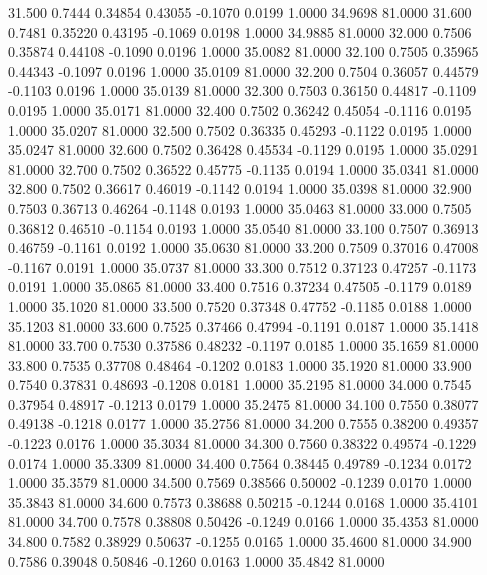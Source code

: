   31.500   0.7444   0.34854   0.43055  -0.1070   0.0199   1.0000  34.9698  81.0000
  31.600   0.7481   0.35220   0.43195  -0.1069   0.0198   1.0000  34.9885  81.0000
  32.000   0.7506   0.35874   0.44108  -0.1090   0.0196   1.0000  35.0082  81.0000
  32.100   0.7505   0.35965   0.44343  -0.1097   0.0196   1.0000  35.0109  81.0000
  32.200   0.7504   0.36057   0.44579  -0.1103   0.0196   1.0000  35.0139  81.0000
  32.300   0.7503   0.36150   0.44817  -0.1109   0.0195   1.0000  35.0171  81.0000
  32.400   0.7502   0.36242   0.45054  -0.1116   0.0195   1.0000  35.0207  81.0000
  32.500   0.7502   0.36335   0.45293  -0.1122   0.0195   1.0000  35.0247  81.0000
  32.600   0.7502   0.36428   0.45534  -0.1129   0.0195   1.0000  35.0291  81.0000
  32.700   0.7502   0.36522   0.45775  -0.1135   0.0194   1.0000  35.0341  81.0000
  32.800   0.7502   0.36617   0.46019  -0.1142   0.0194   1.0000  35.0398  81.0000
  32.900   0.7503   0.36713   0.46264  -0.1148   0.0193   1.0000  35.0463  81.0000
  33.000   0.7505   0.36812   0.46510  -0.1154   0.0193   1.0000  35.0540  81.0000
  33.100   0.7507   0.36913   0.46759  -0.1161   0.0192   1.0000  35.0630  81.0000
  33.200   0.7509   0.37016   0.47008  -0.1167   0.0191   1.0000  35.0737  81.0000
  33.300   0.7512   0.37123   0.47257  -0.1173   0.0191   1.0000  35.0865  81.0000
  33.400   0.7516   0.37234   0.47505  -0.1179   0.0189   1.0000  35.1020  81.0000
  33.500   0.7520   0.37348   0.47752  -0.1185   0.0188   1.0000  35.1203  81.0000
  33.600   0.7525   0.37466   0.47994  -0.1191   0.0187   1.0000  35.1418  81.0000
  33.700   0.7530   0.37586   0.48232  -0.1197   0.0185   1.0000  35.1659  81.0000
  33.800   0.7535   0.37708   0.48464  -0.1202   0.0183   1.0000  35.1920  81.0000
  33.900   0.7540   0.37831   0.48693  -0.1208   0.0181   1.0000  35.2195  81.0000
  34.000   0.7545   0.37954   0.48917  -0.1213   0.0179   1.0000  35.2475  81.0000
  34.100   0.7550   0.38077   0.49138  -0.1218   0.0177   1.0000  35.2756  81.0000
  34.200   0.7555   0.38200   0.49357  -0.1223   0.0176   1.0000  35.3034  81.0000
  34.300   0.7560   0.38322   0.49574  -0.1229   0.0174   1.0000  35.3309  81.0000
  34.400   0.7564   0.38445   0.49789  -0.1234   0.0172   1.0000  35.3579  81.0000
  34.500   0.7569   0.38566   0.50002  -0.1239   0.0170   1.0000  35.3843  81.0000
  34.600   0.7573   0.38688   0.50215  -0.1244   0.0168   1.0000  35.4101  81.0000
  34.700   0.7578   0.38808   0.50426  -0.1249   0.0166   1.0000  35.4353  81.0000
  34.800   0.7582   0.38929   0.50637  -0.1255   0.0165   1.0000  35.4600  81.0000
  34.900   0.7586   0.39048   0.50846  -0.1260   0.0163   1.0000  35.4842  81.0000
